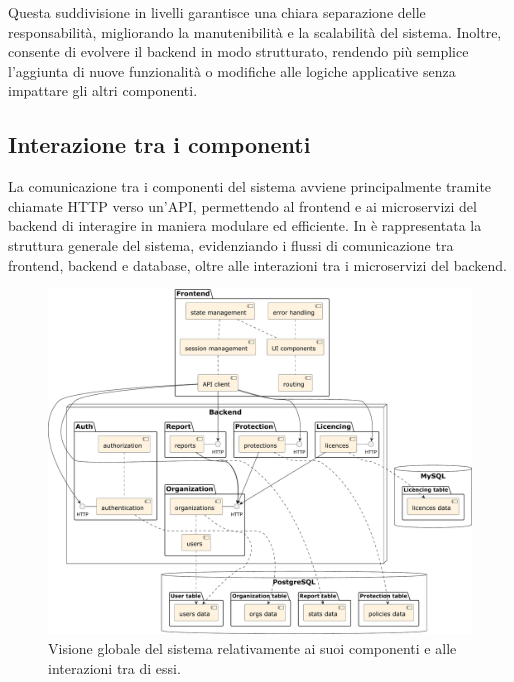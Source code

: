 Questa suddivisione in livelli garantisce una chiara separazione delle responsabilità, migliorando la manutenibilità e la scalabilità del sistema. Inoltre, consente di evolvere il backend in modo strutturato, rendendo più semplice l'aggiunta di nuove funzionalità o modifiche alle logiche applicative senza impattare gli altri componenti.

\subsection{Interazione tra i componenti}
La comunicazione tra i componenti del sistema avviene principalmente tramite chiamate HTTP verso un'API, permettendo al frontend e ai microservizi del backend di interagire in maniera modulare ed efficiente. In  è rappresentata la struttura generale del sistema, evidenziando i flussi di comunicazione tra frontend, backend e database, oltre alle interazioni tra i microservizi del backend.

\begin{figure}
  \centering
  \includegraphics[width=1\textwidth]{figures/global-system-interactions.pdf}
  \caption{Visione globale del sistema relativamente ai suoi componenti e alle interazioni tra di essi.}
  \label{fig:system-interactions}
\end{figure}

